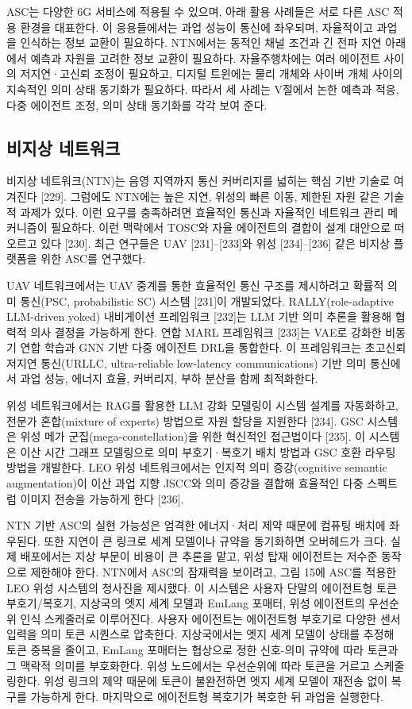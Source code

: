 ASC는 다양한 6G 서비스에 적용될 수 있으며, 아래 활용 사례들은 서로 다른 ASC 적용 환경을 대표한다. 이 응용들에서는 과업 성능이 통신에 좌우되며, 자율적이고 과업을 인식하는 정보 교환이 필요하다. NTN에서는 동적인 채널 조건과 긴 전파 지연 아래에서 예측과 자원을 고려한 정보 교환이 필요하다. 자율주행차에는 여러 에이전트 사이의 저지연·고신뢰 조정이 필요하고, 디지털 트윈에는 물리 개체와 사이버 개체 사이의 지속적인 의미 상태 동기화가 필요하다. 따라서 세 사례는 V절에서 논한 예측과 적응, 다중 에이전트 조정, 의미 상태 동기화를 각각 보여 준다.

\subsection{비지상 네트워크}

비지상 네트워크(NTN)는 음영 지역까지 통신 커버리지를 넓히는 핵심 기반 기술로 여겨진다 [229]. 그럼에도 NTN에는 높은 지연, 위성의 빠른 이동, 제한된 자원 같은 기술적 과제가 있다. 이런 요구를 충족하려면 효율적인 통신과 자율적인 네트워크 관리 메커니즘이 필요하다. 이런 맥락에서 TOSC와 자율 에이전트의 결합이 설계 대안으로 떠오르고 있다 [230]. 최근 연구들은 UAV [231]--[233]와 위성 [234]--[236] 같은 비지상 플랫폼을 위한 ASC를 연구했다.

UAV 네트워크에서는 UAV 중계를 통한 효율적인 통신 구조를 제시하려고 확률적 의미 통신(PSC, probabilistic SC) 시스템 [231]이 개발되었다. RALLY(role-adaptive LLM-driven yoked) 내비게이션 프레임워크 [232]는 LLM 기반 의미 추론을 활용해 협력적 의사 결정을 가능하게 한다. 연합 MARL 프레임워크 [233]는 VAE로 강화한 비동기 연합 학습과 GNN 기반 다중 에이전트 DRL을 통합한다. 이 프레임워크는 초고신뢰 저지연 통신(URLLC, ultra-reliable low-latency communications) 기반 의미 통신에서 과업 성능, 에너지 효율, 커버리지, 부하 분산을 함께 최적화한다.

위성 네트워크에서는 RAG를 활용한 LLM 강화 모델링이 시스템 설계를 자동화하고, 전문가 혼합(mixture of experts) 방법으로 자원 할당을 지원한다 [234]. GSC 시스템은 위성 메가 군집(mega-constellation)을 위한 혁신적인 접근법이다 [235]. 이 시스템은 이산 시간 그래프 모델링으로 의미 부호기·복호기 배치 방법과 GSC 호환 라우팅 방법을 개발한다. LEO 위성 네트워크에서는 인지적 의미 증강(cognitive semantic augmentation)이 이산 과업 지향 JSCC와 의미 증강을 결합해 효율적인 다중 스펙트럼 이미지 전송을 가능하게 한다 [236].

NTN 기반 ASC의 실현 가능성은 엄격한 에너지·처리 제약 때문에 컴퓨팅 배치에 좌우된다. 또한 지연이 큰 링크로 세계 모델이나 규약을 동기화하면 오버헤드가 크다. 실제 배포에서는 지상 부문이 비용이 큰 추론을 맡고, 위성 탑재 에이전트는 저수준 동작으로 제한해야 한다. NTN에서 ASC의 잠재력을 보이려고, 그림 15에 ASC를 적용한 LEO 위성 시스템의 청사진을 제시했다. 이 시스템은 사용자 단말의 에이전트형 토큰 부호기/복호기, 지상국의 엣지 세계 모델과 EmLang 포매터, 위성 에이전트의 우선순위 인식 스케줄러로 이루어진다. 사용자 에이전트는 에이전트형 부호기로 다양한 센서 입력을 의미 토큰 시퀀스로 압축한다. 지상국에서는 엣지 세계 모델이 상태를 추정해 토큰 중복을 줄이고, EmLang 포매터는 협상으로 정한 신호-의미 규약에 따라 토큰과 그 맥락적 의미를 부호화한다. 위성 노드에서는 우선순위에 따라 토큰을 거르고 스케줄링한다. 위성 링크의 제약 때문에 토큰이 불완전하면 엣지 세계 모델이 재전송 없이 복구를 가능하게 한다. 마지막으로 에이전트형 복호기가 복호한 뒤 과업을 실행한다.

